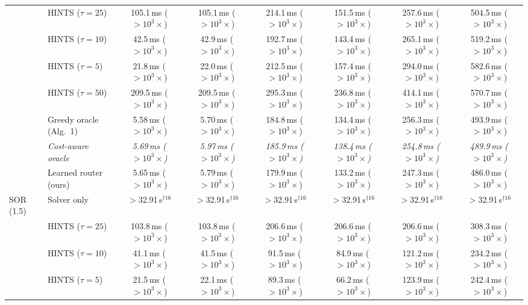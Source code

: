 {\begin{tabular}{llcccccc}
 & HINTS ($\tau{=}25$) & 105.1\,ms ($>10^{3}\times$) & 105.1\,ms ($>10^{3}\times$) & 214.1\,ms ($>10^{3}\times$) & 151.5\,ms ($>10^{3}\times$) & 257.6\,ms ($>10^{3}\times$) & 504.5\,ms ($>10^{3}\times$) \\
 & HINTS ($\tau{=}10$) & 42.5\,ms ($>10^{3}\times$) & 42.9\,ms ($>10^{3}\times$) & 192.7\,ms ($>10^{3}\times$) & 143.4\,ms ($>10^{3}\times$) & 265.1\,ms ($>10^{3}\times$) & 519.2\,ms ($>10^{3}\times$) \\
 & HINTS ($\tau{=}5$) & 21.8\,ms ($>10^{3}\times$) & 22.0\,ms ($>10^{3}\times$) & 212.5\,ms ($>10^{3}\times$) & 157.4\,ms ($>10^{3}\times$) & 294.0\,ms ($>10^{3}\times$) & 582.6\,ms ($>10^{3}\times$) \\
 & HINTS ($\tau{=}50$) & 209.5\,ms ($>10^{3}\times$) & 209.5\,ms ($>10^{3}\times$) & 295.3\,ms ($>10^{3}\times$) & 236.8\,ms ($>10^{3}\times$) & 414.1\,ms ($>10^{3}\times$) & 570.7\,ms ($>10^{3}\times$) \\
 & Greedy oracle (Alg.~1) & 5.58\,ms ($>10^{3}\times$) & 5.70\,ms ($>10^{3}\times$) & 184.8\,ms ($>10^{3}\times$) & 134.4\,ms ($>10^{3}\times$) & 256.3\,ms ($>10^{3}\times$) & 493.9\,ms ($>10^{3}\times$) \\
 & \textit{Cost-aware oracle} & \textit{5.69\,ms ($>10^{3}\times$)} & \textit{5.97\,ms ($>10^{3}\times$)} & \textit{185.9\,ms ($>10^{3}\times$)} & \textit{138.4\,ms ($>10^{3}\times$)} & \textit{254.8\,ms ($>10^{3}\times$)} & \textit{489.9\,ms ($>10^{3}\times$)} \\
 & Learned router (ours) & 5.65\,ms ($>10^{3}\times$) & 5.79\,ms ($>10^{3}\times$) & 179.9\,ms ($>10^{3}\times$) & 133.2\,ms ($>10^{3}\times$) & 247.3\,ms ($>10^{3}\times$) & 486.0\,ms ($>10^{3}\times$) \\
\midrule
SOR (1.5) & Solver only & $>$32.91\,s$^{\dagger 16}$ & $>$32.91\,s$^{\dagger 16}$ & $>$32.91\,s$^{\dagger 16}$ & $>$32.91\,s$^{\dagger 16}$ & $>$32.91\,s$^{\dagger 16}$ & $>$32.91\,s$^{\dagger 16}$ \\
 & HINTS ($\tau{=}25$) & 103.8\,ms ($>10^{3}\times$) & 103.8\,ms ($>10^{3}\times$) & 206.6\,ms ($>10^{3}\times$) & 206.6\,ms ($>10^{3}\times$) & 206.6\,ms ($>10^{3}\times$) & 308.3\,ms ($>10^{3}\times$) \\
 & HINTS ($\tau{=}10$) & 41.1\,ms ($>10^{3}\times$) & 41.5\,ms ($>10^{3}\times$) & 91.5\,ms ($>10^{3}\times$) & 84.9\,ms ($>10^{3}\times$) & 121.2\,ms ($>10^{3}\times$) & 234.2\,ms ($>10^{3}\times$) \\
 & HINTS ($\tau{=}5$) & 21.5\,ms ($>10^{3}\times$) & 22.1\,ms ($>10^{3}\times$) & 89.3\,ms ($>10^{3}\times$) & 66.2\,ms ($>10^{3}\times$) & 123.9\,ms ($>10^{3}\times$) & 242.4\,ms ($>10^{3}\times$) \\

\end{tabular}}

